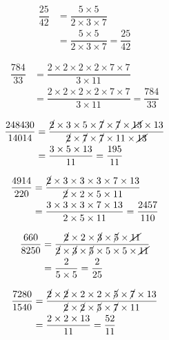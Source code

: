 {{\item\begin{align*}
    \dfrac{25}{42} &=
    \dfrac{5 \times 5}
    {2 \times 3 \times 7}\\ &=
    \dfrac{5 \times 5}
    {2 \times 3 \times 7} =
    \dfrac{25}{42}
    \end{align*}

\item\begin{align*}
    \dfrac{784}{33} &=
    \dfrac{2 \times 2 \times 2 \times 2 \times 7 \times 7}
    {3 \times 11}\\ &=
    \dfrac{2 \times 2 \times 2 \times 2 \times 7 \times 7}
    {3 \times 11} =
    \dfrac{784}{33}
    \end{align*}

\item\begin{align*}
    \dfrac{248430}{14014} &=
    \dfrac{\cancel{2} \times 3 \times 5 \times \cancel{7} \times \cancel{7} \times \cancel{13} \times 13}
    {\cancel{2} \times \cancel{7} \times \cancel{7} \times 11 \times \cancel{13}}\\ &=
    \dfrac{3 \times 5 \times 13}
    {11} =
    \dfrac{195}{11}
    \end{align*}

\item\begin{align*}
    \dfrac{4914}{220} &=
    \dfrac{\cancel{2} \times 3 \times 3 \times 3 \times 7 \times 13}
    {\cancel{2} \times 2 \times 5 \times 11}\\ &=
    \dfrac{3 \times 3 \times 3 \times 7 \times 13}
    {2 \times 5 \times 11} =
    \dfrac{2457}{110}
    \end{align*}

\item\begin{align*}
    \dfrac{660}{8250} &=
    \dfrac{\cancel{2} \times 2 \times \cancel{3} \times \cancel{5} \times \cancel{11}}
    {\cancel{2} \times \cancel{3} \times \cancel{5} \times 5 \times 5 \times \cancel{11}}\\ &=
    \dfrac{2}
    {5 \times 5} =
    \dfrac{2}{25}
    \end{align*}

\item\begin{align*}
    \dfrac{7280}{1540} &=
    \dfrac{\cancel{2} \times \cancel{2} \times 2 \times 2 \times \cancel{5} \times \cancel{7} \times 13}
    {\cancel{2} \times \cancel{2} \times \cancel{5} \times \cancel{7} \times 11}\\ &=
    \dfrac{2 \times 2 \times 13}
    {11} =
    \dfrac{52}{11}
    \end{align*}

}}
